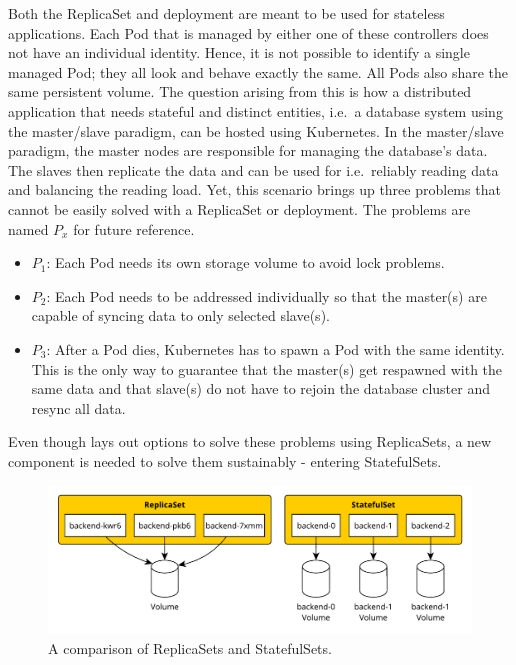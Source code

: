 
Both the ReplicaSet and deployment are meant to be used for stateless
applications. Each Pod that is managed by either one of these controllers does
not have an individual identity. Hence, it is not possible to identify a single
managed Pod; they all look and behave exactly the same. All Pods also share the
same persistent volume. The question arising from this is how a distributed
application that needs stateful and distinct entities, i.e.\ a database system
using the master/slave paradigm, can be hosted using Kubernetes. In the
master/slave paradigm, the master nodes are responsible for managing the
database's data. The slaves then replicate the data and can be used for i.e.\
reliably reading data and balancing the reading load. Yet, this scenario brings
up three problems that cannot be easily solved with a ReplicaSet or
deployment. The problems are named $P_x$ for future reference.

\begin{itemize}
  \item \textbf{$P_1$}: Each Pod needs its own storage volume to avoid lock problems.
  \item \textbf{$P_2$}: Each Pod needs to be addressed individually so that the master(s) are
    capable of syncing data to only selected slave(s).
  \item \textbf{$P_3$}: After a Pod dies, Kubernetes has to spawn a Pod with
    the same identity. This is the only way to guarantee that the master(s)
    get respawned with the same data and that slave(s) do not have to rejoin
    the database cluster and resync all data.
\end{itemize}

Even though \autocite[Ch. 10]{LuksaKubernetesAction2017} lays out options to
solve these problems using ReplicaSets, a new component is needed to solve them
sustainably - entering StatefulSets. 

\begin{figure}[H]
  \begin{center}
  \includegraphics[scale=0.65]{images/figures/statefulSets_vs_replicaSets.pdf}
\end{center}
\caption{A comparison of ReplicaSets and StatefulSets.}%
\label{fig:statefulSetsVSReplicaSets}
\end{figure}

